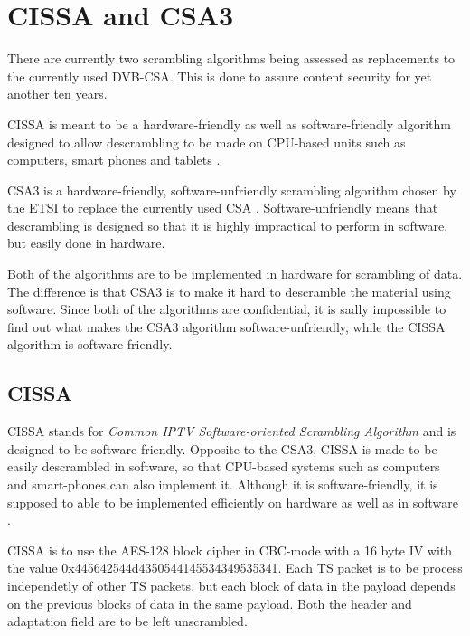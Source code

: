 \chapter{CISSA and CSA3}
There are currently two scrambling algorithms being assessed as replacements to 
the currently used DVB-CSA. This is done to assure content security for 
yet another ten years.


CISSA is meant to be a hardware-friendly as well as software-friendly algorithm 
designed to allow descrambling to be made on CPU-based units such as computers, 
smart phones and tablets \citep[p. 9]{DVB:2013}.

CSA3 is a hardware-friendly, software-unfriendly scrambling algorithm chosen by 
the ETSI to replace the currently used CSA \citep[pp. 6--7]{DVB:2013}. 
Software-unfriendly means that descrambling is designed so that it is highly 
impractical to perform in software, but easily done in hardware.

Both of the algorithms are to be implemented in hardware for scrambling of data.
The difference is that CSA3 is to make it hard to descramble the material using 
software. Since both of the algorithms are confidential, it is sadly impossible 
to find out what makes the CSA3 algorithm software-unfriendly, while the CISSA 
algorithm is software-friendly. 

\section{CISSA}
CISSA stands for \emph{Common IPTV Software-oriented Scrambling Algorithm} and 
is designed to be software-friendly. Opposite to the CSA3, CISSA is made to be 
easily descrambled in software, so that CPU-based systems such as computers and 
smart-phones can also implement it.  Although it is software-friendly, it is 
supposed to able to be implemented efficiently on hardware as well as in 
software \citep[p. 9]{DVB:2013}.

CISSA is to use the AES-128 block cipher in CBC-mode with a 16 byte IV with the 
value 0x445642544d4350544145534349535341. Each TS packet is to be process 
independetly of other TS packets, but each block of data in the payload depends 
on the previous blocks of data in the same payload. Both the header and 
adaptation field are to be left unscrambled. \citep[p. 11]{DVB:2013}


